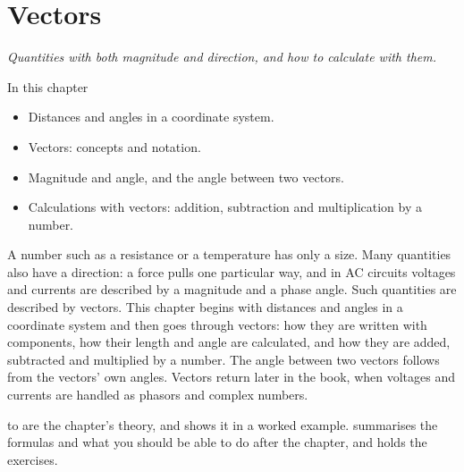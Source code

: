
\chapter{Vectors}
\label{c7:ch}

{\large\itshape Quantities with both magnitude and direction, and how to calculate with them.\par}

\begin{chapterbox}{In this chapter}
\begin{itemize}
  \item Distances and angles in a coordinate system.
  \item Vectors: concepts and notation.
  \item Magnitude and angle, and the angle between two vectors.
  \item Calculations with vectors: addition, subtraction and multiplication by a number.
\end{itemize}
\end{chapterbox}

A number such as a resistance or a temperature has only a size. Many quantities also have a
direction: a force pulls one particular way, and in AC circuits voltages and currents are
described by a magnitude and a phase angle. Such quantities are described by vectors. This chapter
begins with distances and angles in a coordinate system and then goes through vectors: how they
are written with components, how their length and angle are calculated, and how they are added,
subtracted and multiplied by a number. The angle between two vectors follows from the vectors'
own angles. Vectors return later in the book, when voltages and currents are handled as phasors
and complex numbers.

 to  are the chapter's theory, and
 shows it in a worked example. 
summarises the formulas and what you should be able to do after the chapter, and
 holds the exercises.




